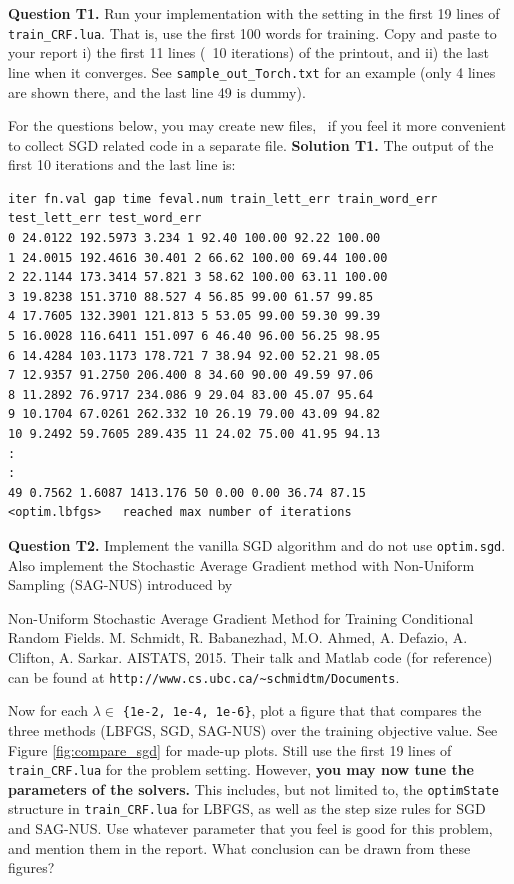 \documentclass[11pt]{report}
\begin{document}
{{\bf Question T1.}
Run your implementation with the setting in the first 19 lines of \verb!train_CRF.lua!.
That is, use the first 100 words for training.
Copy and paste to your report
i) the first 11 lines (\ie\ 10 iterations) of the printout,
and
ii) the last line when it converges.
%
See \verb!sample_out_Torch.txt! for an example (only 4 lines are shown there, and the last line 49 is dummy).


For the questions below, you may create new files,
\eg\ if you feel it more convenient to collect SGD related code in a separate file.
{\bf Solution T1.}
The output of the first 10 iterations and the last line is: 

\vspace{-1em}
\begin{verbatim}
iter fn.val gap time feval.num train_lett_err train_word_err test_lett_err test_word_err
0 24.0122 192.5973 3.234 1 92.40 100.00 92.22 100.00
1 24.0015 192.4616 30.401 2 66.62 100.00 69.44 100.00
2 22.1144 173.3414 57.821 3 58.62 100.00 63.11 100.00
3 19.8238 151.3710 88.527 4 56.85 99.00 61.57 99.85
4 17.7605 132.3901 121.813 5 53.05 99.00 59.30 99.39
5 16.0028 116.6411 151.097 6 46.40 96.00 56.25 98.95
6 14.4284 103.1173 178.721 7 38.94 92.00 52.21 98.05
7 12.9357 91.2750 206.400 8 34.60 90.00 49.59 97.06
8 11.2892 76.9717 234.086 9 29.04 83.00 45.07 95.64
9 10.1704 67.0261 262.332 10 26.19 79.00 43.09 94.82
10 9.2492 59.7605 289.435 11 24.02 75.00 41.95 94.13
:
:
49 0.7562 1.6087 1413.176 50 0.00 0.00 36.74 87.15
<optim.lbfgs> 	reached max number of iterations
\end{verbatim}

{\bf Question T2.}
Implement the vanilla SGD algorithm and do not use \verb!optim.sgd!.
Also implement the Stochastic Average Gradient method with Non-Uniform Sampling (SAG-NUS) introduced by
\vspace{0.5em}

Non-Uniform Stochastic Average Gradient Method for Training Conditional Random Fields.
M. Schmidt, R. Babanezhad, M.O. Ahmed, A. Defazio, A. Clifton, A. Sarkar. AISTATS, 2015.
%
Their talk and Matlab code (for reference) can be found at
\verb!http://www.cs.ubc.ca/~schmidtm/Documents!.


Now for each $\lambda \in$ \verb!{1e-2, 1e-4, 1e-6}!,
plot a figure that that compares the three methods (LBFGS, SGD, SAG-NUS) over the training objective value.
See Figure \ref{fig:compare_sgd} for made-up plots.
Still use the first 19 lines of \verb!train_CRF.lua! for the problem setting.
However, {\bf you may now tune the parameters of the solvers.}
This includes, but not limited to, the \verb!optimState! structure in \verb!train_CRF.lua! for LBFGS,
as well as the step size rules for SGD and SAG-NUS.
Use whatever parameter that you feel is good for this problem,
and mention them in the report.
What conclusion can be drawn from these figures?

}
\end{document}
